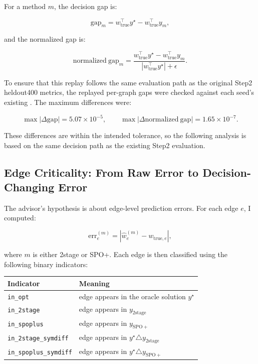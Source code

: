 \documentclass[11pt]{article}
\begin{document}
For a method $m$, the decision gap is:

\[
\mathrm{gap}_m
=
w_{\mathrm{true}}^\top y^\star
-
w_{\mathrm{true}}^\top y_m,
\]

and the normalized gap is:

\[
\mathrm{normalized\ gap}_m
=
\frac{
w_{\mathrm{true}}^\top y^\star
-
w_{\mathrm{true}}^\top y_m
}{
\left|w_{\mathrm{true}}^\top y^\star\right| + \epsilon
}.
\]

To ensure that this replay follows the same evaluation path as the original
Step2 heldout400 metrics, the replayed per-graph gaps were checked against each
seed's existing . The maximum differences
were:

\[
\max |\Delta \mathrm{gap}| = 5.07\times 10^{-5}, \qquad
\max |\Delta \mathrm{normalized\ gap}| = 1.65\times 10^{-7}.
\]

These differences are within the intended tolerance, so the following analysis
is based on the same decision path as the existing Step2 evaluation.

\subsection{Edge Criticality: From Raw Error to Decision-Changing Error}
The advisor's hypothesis is about edge-level prediction errors. For each edge
$e$, I computed:

\[
\mathrm{err}_e^{(m)} =
\left|
\hat{w}_e^{(m)} - w_{\mathrm{true},e}
\right|,
\]

where $m$ is either 2stage or SPO+. Each edge is then classified using the
following binary indicators:

\begin{center}
\small
\begin{tabular}{ll}
\toprule
Indicator & Meaning \\
\midrule
\texttt{in\_opt} & edge appears in the oracle solution $y^\star$ \\
\texttt{in\_2stage} & edge appears in $y_{\mathrm{2stage}}$ \\
\texttt{in\_spoplus} & edge appears in $y_{\mathrm{SPO+}}$ \\
\texttt{in\_2stage\_symdiff} & edge appears in $y^\star \triangle y_{\mathrm{2stage}}$ \\
\texttt{in\_spoplus\_symdiff} & edge appears in $y^\star \triangle y_{\mathrm{SPO+}}$ \\
\bottomrule
\end{tabular}
\end{center}
\end{document}
